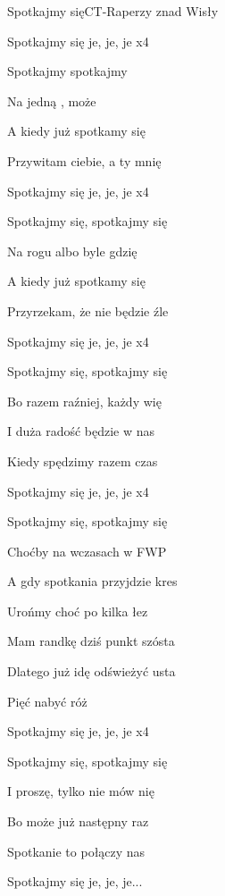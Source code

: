 \begin{song}{Spotkajmy się}{C}{}{T-Raperzy znad Wisły}{}{}
  \begin{SBChorus}
    Spotkajmy się je, je, je x4
  \end{SBChorus}
  \begin{SBVerse}
    Spotkajmy  spotkajmy 

    Na jedną , może 

    A kiedy już spotkamy się

    Przywitam ciebie, a ty mnię
  \end{SBVerse}
  \begin{SBChorus}
    Spotkajmy się je, je, je x4
  \end{SBChorus}
  \begin{SBVerse}
    Spotkajmy się, spotkajmy się

    Na rogu albo byle gdzię

    A kiedy już spotkamy się

    Przyrzekam, że nie będzie źle
  \end{SBVerse}
  \begin{SBChorus}
    Spotkajmy się je, je, je x4
  \end{SBChorus}
  \begin{SBVerse}
    Spotkajmy się, spotkajmy się

    Bo razem raźniej, każdy wię

    I duża radość będzie w nas

    Kiedy spędzimy razem czas
  \end{SBVerse}
  \begin{SBChorus}
    Spotkajmy się je, je, je x4
  \end{SBChorus}
  \begin{SBVerse}
    Spotkajmy się, spotkajmy się

    Choćby na wczasach w FWP

    A gdy spotkania przyjdzie kres

    Urońmy choć po kilka łez
  \end{SBVerse}
  \begin{SBVerse}
    Mam randkę dziś punkt szósta

    Dlatego już idę odświeżyć usta

    Pięć nabyć róż
  \end{SBVerse}
  \begin{SBChorus}
    Spotkajmy się je, je, je x4
  \end{SBChorus}
  \begin{SBVerse}
    Spotkajmy się, spotkajmy się

    I proszę, tylko nie mów nię

    Bo może już następny raz

    Spotkanie to połączy nas

    Spotkajmy się je, je, je...
  \end{SBVerse}
\end{song}
